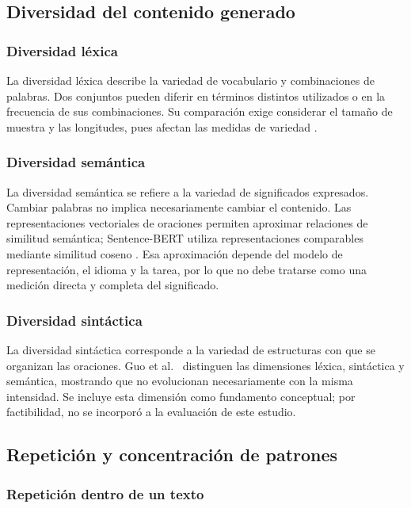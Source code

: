 \documentclass[12pt,letterpaper]{article}
\begin{document}
\subsection{Diversidad del contenido generado}

\subsubsection{Diversidad léxica}

La diversidad léxica describe la variedad de vocabulario y combinaciones
de palabras. Dos conjuntos pueden diferir en términos distintos utilizados
o en la frecuencia de sus combinaciones. Su comparación exige considerar
el tamaño de muestra y las longitudes, pues afectan las medidas de variedad
\cite{guo2024}.

\subsubsection{Diversidad semántica}

La diversidad semántica se refiere a la variedad de significados expresados.
Cambiar palabras no implica necesariamente cambiar el contenido. Las
representaciones vectoriales de oraciones permiten aproximar relaciones
de similitud semántica; Sentence-BERT utiliza representaciones comparables
mediante similitud coseno \cite{reimers2019}. Esa aproximación depende del
modelo de representación, el idioma y la tarea, por lo que no debe tratarse
como una medición directa y completa del significado.

\subsubsection{Diversidad sintáctica}

La diversidad sintáctica corresponde a la variedad de estructuras con que
se organizan las oraciones. Guo et al.\ \cite{guo2024} distinguen las
dimensiones léxica, sintáctica y semántica, mostrando que no evolucionan
necesariamente con la misma intensidad. Se incluye esta dimensión como
fundamento conceptual; por factibilidad, no se incorporó a la evaluación
de este estudio.

\subsection{Repetición y concentración de patrones}

\subsubsection{Repetición dentro de un texto}
\end{document}
